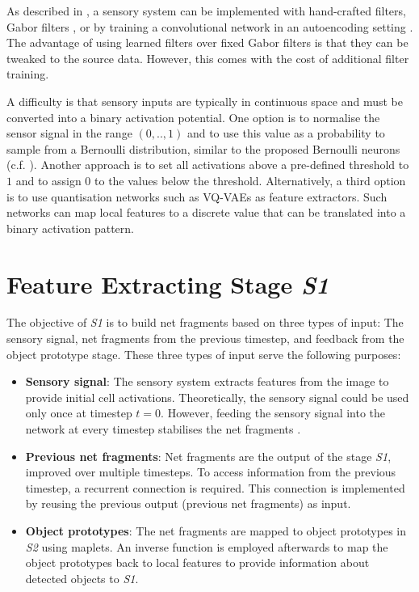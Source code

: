 As described in , a sensory system can be implemented with hand-crafted filters, Gabor filters \cite{gabor_theory_1946, granlund_search_1978}, or by training a convolutional network  in an autoencoding setting . The advantage of using learned filters over fixed Gabor filters is that they can be tweaked to the source data. However, this comes with the cost of additional filter training.

A difficulty is that sensory inputs are typically in continuous space and must be converted into a binary activation potential.
One option is to normalise the sensor signal in the range $(0, .., 1)$ and to use this value as a probability to sample from a Bernoulli distribution, similar to the proposed Bernoulli neurons (c.f. ).
Another approach is to set all activations above a pre-defined threshold to $1$ and to assign 0 to the values below the threshold.
Alternatively, a third option is to use quantisation networks such as VQ-VAEs  as feature extractors. Such networks can map local features to a discrete value that can be translated into a binary activation pattern.


\section{Feature Extracting Stage \emph{S1}}
The objective of \emph{S1} is to build net fragments based on three types of input: The sensory signal, net fragments from the previous timestep, and feedback from the object prototype stage.
These three types of input serve the following purposes:
\begin{itemize}
    \item \textbf{Sensory signal}: The sensory system extracts features from the image to provide initial cell activations. Theoretically, the sensory signal could be used only once at timestep $t=0$. However, feeding the sensory signal into the network at every timestep stabilises the net fragments .
    \item \textbf{Previous net fragments}: Net fragments are the output of the stage \emph{S1}, improved over multiple timesteps.
    To access information from the previous timestep, a recurrent connection is required. This connection is implemented by reusing the previous output (previous net fragments) as input.
    \item \textbf{Object prototypes}: The net fragments are mapped to object prototypes in \emph{S2} using maplets. An inverse function is employed afterwards to map the object prototypes back to local features to provide information about detected objects to \emph{S1}.
\end{itemize}

